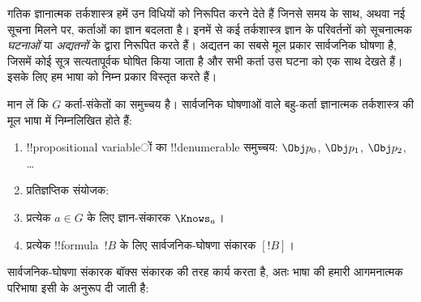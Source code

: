 \documentclass[../../../include/open-logic-section]{subfiles}
\begin{document}


गतिक ज्ञानात्मक तर्कशास्त्र हमें उन विधियों को निरूपित करने देते हैं जिनसे
समय के साथ, अथवा नई सूचना मिलने पर, कर्ताओं का ज्ञान बदलता है। इनमें से कई
तर्कशास्त्र ज्ञान के परिवर्तनों को सूचनात्मक \emph{घटनाओं} या
\emph{अद्यतनों} के द्वारा निरूपित करते हैं। अद्यतन का सबसे मूल प्रकार
सार्वजनिक घोषणा है, जिसमें कोई सूत्र सत्यतापूर्वक घोषित किया जाता है और सभी
कर्ता उस घटना को एक साथ देखते हैं। इसके लिए हम भाषा को निम्न प्रकार विस्तृत
करते हैं।

\begin{defn}
मान लें कि $G$ कर्ता-संकेतों का समुच्चय है। सार्वजनिक घोषणाओं वाले बहु-कर्ता
ज्ञानात्मक तर्कशास्त्र की मूल भाषा में निम्नलिखित होते हैं:
\begin{enumerate}
  \item !!{propositional variable}ों का !!{denumerable} समुच्चय: $\Obj
    p_0$, $\Obj p_1$, $\Obj p_2$, \dots
  \item प्रतिज्ञप्तिक संयोजक: \startycommalist
  \item प्रत्येक $a \in G$ के लिए ज्ञान-संकारक $\Knows_a$।
  \item प्रत्येक !!{formula}~$!B$ के लिए सार्वजनिक-घोषणा संकारक $[!B]$।
\end{enumerate}
\end{defn}

सार्वजनिक-घोषणा संकारक बॉक्स संकारक की तरह कार्य करता है, अतः भाषा की हमारी
आगमनात्मक परिभाषा इसी के अनुरूप दी जाती है:
\end{document}
